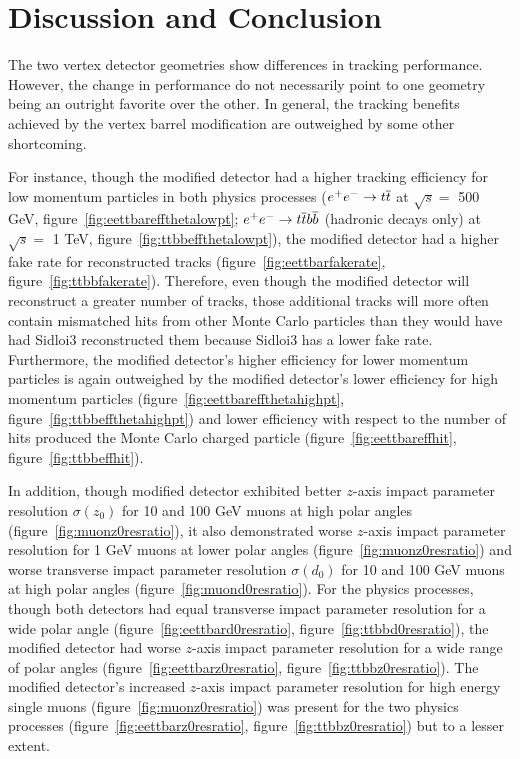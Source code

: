\section{Discussion and Conclusion}
The two vertex detector geometries show differences in tracking performance.
However, the change in performance do not necessarily point to
one geometry being an outright favorite over the other.
In general, the tracking benefits achieved by the vertex barrel modification are
outweighed by some other shortcoming.

For instance, though the modified detector had a higher tracking efficiency for low momentum particles
in both physics processes ($\ee \rightarrow \ttbar$ at $ \sqrt{s} = $ 500 GeV, figure~\ref{fig:eettbareffthetalowpt}; 
$\ee \rightarrow \ttbar \bbbar$ (hadronic decays only) at $ \sqrt{s} = $ 1 TeV, figure~\ref{fig:ttbbeffthetalowpt}),
the modified detector had a higher fake rate for reconstructed tracks (figure~\ref{fig:eettbarfakerate}, figure~\ref{fig:ttbbfakerate}).
Therefore, even though the modified detector will reconstruct a greater number of tracks,
those additional tracks will more often contain mismatched hits from other Monte Carlo particles
than they would have had Sidloi3 reconstructed them because Sidloi3 has a lower fake rate.
Furthermore, the modified detector's higher efficiency for lower momentum particles is again
outweighed by the modified detector's lower efficiency for high momentum particles
(figure~\ref{fig:eettbareffthetahighpt}, figure~\ref{fig:ttbbeffthetahighpt})
and lower efficiency with respect to the number of hits produced the Monte Carlo charged particle
(figure~\ref{fig:eettbareffhit}, figure~\ref{fig:ttbbeffhit}).

In addition, though modified detector
exhibited better $z$-axis impact parameter resolution $\sigma(z_{0})$
for 10 and 100 GeV muons at high polar angles (figure~\ref{fig:muonz0resratio}),
it also demonstrated worse $z$-axis impact parameter resolution
for 1 GeV muons  at lower polar angles (figure~\ref{fig:muonz0resratio})
and worse transverse impact parameter resolution $\sigma(d_{0})$
for 10 and 100 GeV muons at high polar angles (figure~\ref{fig:muond0resratio}).
For the physics processes, though both detectors had
equal transverse impact parameter resolution for a wide polar angle
(figure~\ref{fig:eettbard0resratio}, figure~\ref{fig:ttbbd0resratio}),
the modified detector had worse $z$-axis impact parameter resolution for a wide range
of polar angles (figure~\ref{fig:eettbarz0resratio}, figure~\ref{fig:ttbbz0resratio}).
The modified detector's increased $z$-axis impact parameter resolution 
for high energy single muons (figure~\ref{fig:muonz0resratio})
was present for the two physics processes  (figure~\ref{fig:eettbarz0resratio}, figure~\ref{fig:ttbbz0resratio})
 but to a lesser extent.

